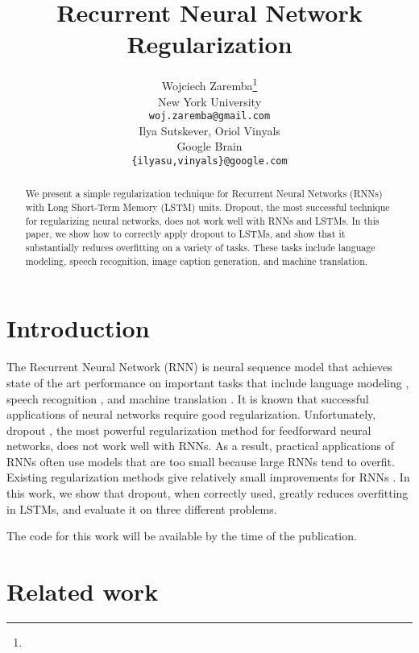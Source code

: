 \documentclass{article} %
\title{Recurrent Neural Network Regularization}
\author{
Wojciech Zaremba\footnote{}\footnotetext{Work done while the author was in Google Brain.} \\
New York University\\
\texttt{woj.zaremba@gmail.com} \\
\And
Ilya Sutskever, Oriol Vinyals \\
Google Brain \\
\texttt{\{ilyasu,vinyals\}@google.com} \\
}
\begin{document}
\maketitle

\begin{abstract}
  We present a simple regularization technique for Recurrent Neural
  Networks (RNNs) with Long Short-Term Memory (LSTM) units.  Dropout,
  the most successful technique for regularizing neural networks, does
  not work well with RNNs and LSTMs.  In this paper, we show how to
  correctly apply dropout to LSTMs, and show that it
  substantially reduces overfitting on a variety of tasks. These tasks
  include language modeling, speech recognition, image caption generation, and machine
  translation.
\end{abstract}


\section{Introduction}

The Recurrent Neural Network (RNN) is neural sequence model that achieves state of the art
performance on important tasks that include language modeling
\cite{mikolov2012statistical}, speech recognition
\cite{graves2013speech}, and machine translation
\cite{kal13}.  It is known that successful applications of
neural networks require good regularization. Unfortunately, dropout
\cite{srivastava2013improving}, the most powerful regularization method
for feedforward neural networks, does not work well with
RNNs. As a result, practical applications of RNNs often
use models that are too small because large RNNs tend to overfit.  
Existing regularization methods give relatively small improvements for
RNNs \cite{graves2013generating}.
In this work, we show that dropout, when correctly used,
greatly reduces overfitting in LSTMs, and evaluate it on three different problems.


The code for this work will be available by the time of the publication.

\section{Related work}
\end{document}

